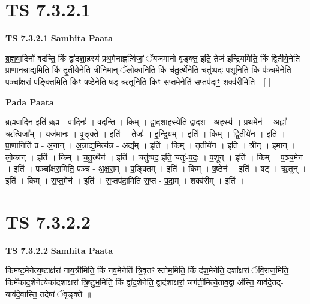 \documentclass[17pt]{extarticle}
\begin{document}

\section{ TS 7.3.2.1 }

\textbf{TS 7.3.2.1 } \newline
\textbf{Samhita Paata} \newline

ब्र॒ह्म॒वा॒दिनो॑ वदन्ति॒ किं द्वा॑दशा॒हस्य॑ प्रथ॒मेनाह्न॒र्त्विजां॒ ॅयज॑मानो वृङ्क्त॒ इति॒ तेज॑ इन्द्रि॒यमिति॒ किं द्वि॒तीये॒नेति॑ प्रा॒णान॒न्नाद्य॒मिति॒ किं तृ॒तीये॒नेति॒ त्रीनि॒मान् ॅलो॒कानिति॒ किं च॑तु॒र्त्थेनेति॒ चतु॑ष्पदः प॒शूनिति॒ किं प॑ञ्च॒मेनेति॒ पञ्चा᳚क्षरां प॒ङ्क्तिमिति॒ किꣳ ष॒ष्ठेनेति॒ षड् ऋ॒तूनिति॒ किꣳ स॑प्त॒मेनेति॑ स॒प्तप॑दाꣳ॒॒ शक्व॑री॒मिति॒ - [  ] \newline

\textbf{Pada Paata} \newline

ब्र॒ह्म॒वा॒दिन॒ इति॑ ब्रह्म - वा॒दिनः॑ । व॒द॒न्ति॒ । किम् । द्वा॒द॒शा॒हस्येति॑ द्वादश - अ॒हस्य॑ । प्र॒थ॒मेन॑ । अह्ना᳚ । ऋ॒त्विजा᳚म् । यज॑मानः । वृ॒ङ्क्ते॒ । इति॑ । तेजः॑ । इ॒न्द्रि॒यम् । इति॑ । किम् । द्वि॒तीये॑न । इति॑ । प्रा॒णानिति॑ प्र - अ॒नान् । अ॒न्नाद्य॒मित्य॑न्न - अद्य᳚म् । इति॑ । किम् । तृ॒तीये॑न । इति॑ । त्रीन् । इ॒मान् । लो॒कान् । इति॑ । किम् । च॒तु॒र्त्थेन॑ । इति॑ । चतु॑ष्पद॒ इति॒ चतुः॑-प॒दः॒ । प॒शून् । इति॑ । किम् । प॒ञ्च॒मेन॑ । इति॑ । पञ्चा᳚क्षरा॒मिति॒ पञ्च॑ - अ॒क्ष॒रा॒म् । प॒ङ्क्तिम् । इति॑ । किम् । ष॒ष्ठेन॑ । इति॑ । षट् । ऋ॒तून् । इति॑ । किम् । स॒प्त॒मेन॑ । इति॑ । स॒प्तप॑दा॒मिति॑ स॒प्त - प॒दा॒म् । शक्व॑रीम् । इति॑ ।  \newline





\section{ TS 7.3.2.2 }

\textbf{TS 7.3.2.2 } \newline
\textbf{Samhita Paata} \newline

किम॑ष्ट॒मेनेत्य॒ष्टाक्ष॑रां गाय॒त्रीमिति॒ किं न॑व॒मेनेति॑ त्रि॒वृतꣳ॒॒ स्तोम॒मिति॒ किं द॑श॒मेनेति॒ दशा᳚क्षरां ॅवि॒राज॒मिति॒ किमे॑काद॒शेनेत्येका॑दशाक्षरां त्रि॒ष्टुभ॒मिति॒ किं द्वा॑द॒शेनेति॒ द्वाद॑शाक्षरां॒ जग॑ती॒मित्ये॒ताव॒द्वा अ॑स्ति॒ याव॑दे॒तद्-याव॑दे॒वास्ति॒ तदे॑षां ॅवृङ्क्ते ॥ \newline
\end{document}
